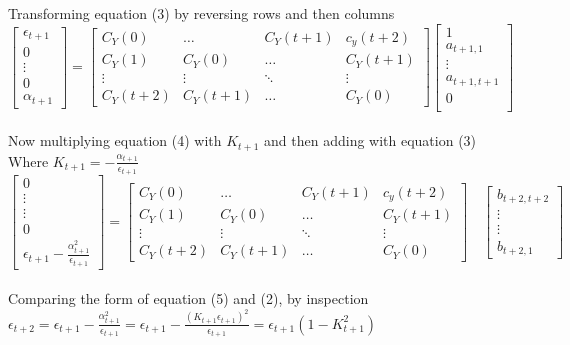 \documentclass[11pt]{article}
\begin{document}
{Transforming equation (3) by reversing rows and then columns\\
\begin{equation}
\begin{bmatrix}
\epsilon_{t+1}\\
0\\
\vdots\\
0 \\
\alpha_{t+1}
\end{bmatrix} = 
\begin{bmatrix}
C_Y(0) &\ldots &C_Y(t+1) &c_y(t+2)\\
C_Y(1) &C_Y(0) &\ldots &C_Y(t+1)\\
\vdots &\vdots &\ddots &\vdots\\
C_Y(t+2) &C_Y(t+1) &\ldots &C_Y(0)
\end{bmatrix}
\begin{bmatrix}
1\\
a_{t+1,1}\\
\vdots\\
a_{t+1,t+1}\\
0\\
\end{bmatrix}
\end{equation}\\
Now multiplying equation (4) with $K_{t+1}$ and then adding with equation (3)\\
Where $K_{t+1} = -\frac{\alpha_{t+1}}{\epsilon_{t+1}}$\\
\begin{equation}
\begin{bmatrix}
0 \\
\vdots\\
\vdots\\
0\\
\epsilon_{t+1}-\frac{\alpha_{t+1}^2}{\epsilon_{t+1}}
\end{bmatrix} = 
\begin{bmatrix}
C_Y(0) &\ldots &C_Y(t+1) &c_y(t+2)\\
C_Y(1) &C_Y(0) &\ldots &C_Y(t+1)\\
\vdots &\vdots &\ddots &\vdots\\
C_Y(t+2) &C_Y(t+1) &\ldots &C_Y(0)
\end{bmatrix}\quad 
\begin{bmatrix}
b_{t+2,t+2}\\
\vdots\\
\vdots\\
b_{t+2,1}
\end{bmatrix}
\end{equation}\\
Comparing the form of equation (5) and (2), by inspection\\
$\epsilon_{t+2} = \epsilon_{t+1} - \frac{\alpha_{t+1}^2}{\epsilon_{t+1}} = \epsilon_{t+1} - \frac{(K_{t+1}\epsilon_{t+1})^2}{\epsilon_{t+1}} = \epsilon_{t+1}(1-K_{t+1}^2)$\\

}
\end{document}
